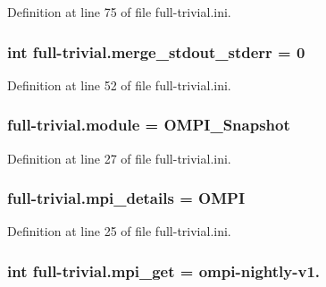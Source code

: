Definition at line 75 of file full-\/trivial.\-ini.

\hypertarget{namespacefull-trivial_abffbc48fc37ad6d7010976ca874c845f}{
\subsubsection[{merge\-\_\-stdout\-\_\-stderr}]{\setlength{\rightskip}{0pt plus 5cm}int full-\/trivial.\-merge\-\_\-stdout\-\_\-stderr = 0}}\label{namespacefull-trivial_abffbc48fc37ad6d7010976ca874c845f}


Definition at line 52 of file full-\/trivial.\-ini.

\hypertarget{namespacefull-trivial_ac8f46360931db54c90bacdbeb7de743d}{
\subsubsection[{module}]{\setlength{\rightskip}{0pt plus 5cm}full-\/trivial.\-module = O\-M\-P\-I\-\_\-\-Snapshot}}\label{namespacefull-trivial_ac8f46360931db54c90bacdbeb7de743d}


Definition at line 27 of file full-\/trivial.\-ini.

\hypertarget{namespacefull-trivial_ac8c1b563f56da3a28444d9ba8c6e9cc9}{
\subsubsection[{mpi\-\_\-details}]{\setlength{\rightskip}{0pt plus 5cm}full-\/trivial.\-mpi\-\_\-details = O\-M\-P\-I}}\label{namespacefull-trivial_ac8c1b563f56da3a28444d9ba8c6e9cc9}


Definition at line 25 of file full-\/trivial.\-ini.

\hypertarget{namespacefull-trivial_a27abf09427482f97a0072b3be7e6601d}{
\subsubsection[{mpi\-\_\-get}]{\setlength{\rightskip}{0pt plus 5cm}int full-\/trivial.\-mpi\-\_\-get = ompi-\/nightly-\/v1.}}\label{namespacefull-trivial_a27abf09427482f97a0072b3be7e6601d}



